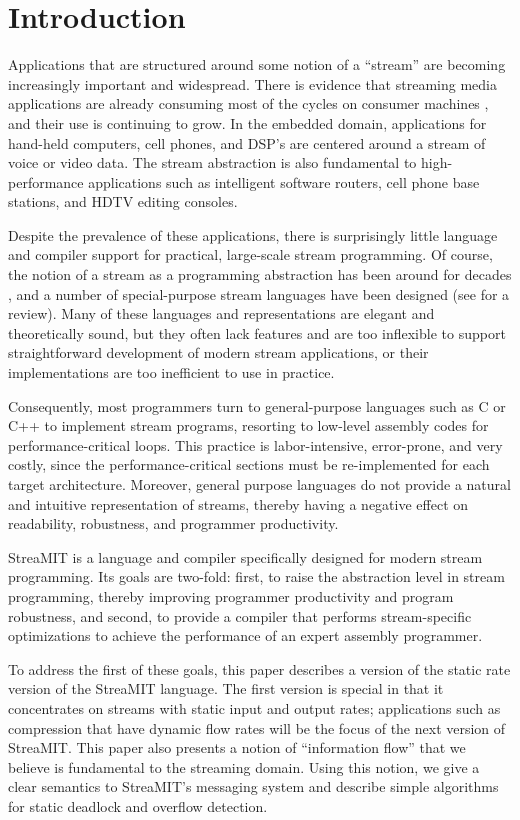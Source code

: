 \section{Introduction}

Applications that are structured around some notion of a ``stream''
are becoming increasingly important and widespread.  There is evidence
that streaming media applications are already consuming most of the
cycles on consumer machines \cite{Rix98}, and their use is continuing
to grow.  In the embedded domain, applications for hand-held
computers, cell phones, and DSP's are centered around a stream of
voice or video data.  The stream abstraction is also fundamental to
high-performance applications such as intelligent software routers,
cell phone base stations, and HDTV editing consoles.

Despite the prevalence of these applications, there is surprisingly
little language and compiler support for practical, large-scale stream
programming.  Of course, the notion of a stream as a programming
abstraction has been around for decades \cite{SICP}, and a number of
special-purpose stream languages have been designed (see
\cite{survey97} for a review).  Many of these languages and
representations are elegant and theoretically sound, but they often
lack features and are too inflexible to support straightforward
development of modern stream applications, or their implementations
are too inefficient to use in practice.

Consequently, most programmers turn to general-purpose languages such
as C or C++ to implement stream programs, resorting to low-level
assembly codes for performance-critical loops.  This practice is
labor-intensive, error-prone, and very costly, since the
performance-critical sections must be re-implemented for each target
architecture.  Moreover, general purpose languages do not provide a
natural and intuitive representation of streams, thereby having a
negative effect on readability, robustness, and programmer
productivity.

StreaMIT is a language and compiler specifically designed for modern
stream programming.  Its goals are two-fold: first, to raise the
abstraction level in stream programming, thereby improving programmer
productivity and program robustness, and second, to provide a compiler
that performs stream-specific optimizations to achieve the performance
of an expert assembly programmer.  

To address the first of these goals, this paper describes a version of
the static rate version of the StreaMIT language.  The first version
is special in that it concentrates on streams with static input and
output rates; applications such as compression that have dynamic flow
rates will be the focus of the next version of StreaMIT.  This paper
also presents a notion of ``information flow'' that we believe is
fundamental to the streaming domain.  Using this notion, we give a
clear semantics to StreaMIT's messaging system and describe simple
algorithms for static deadlock and overflow detection.

